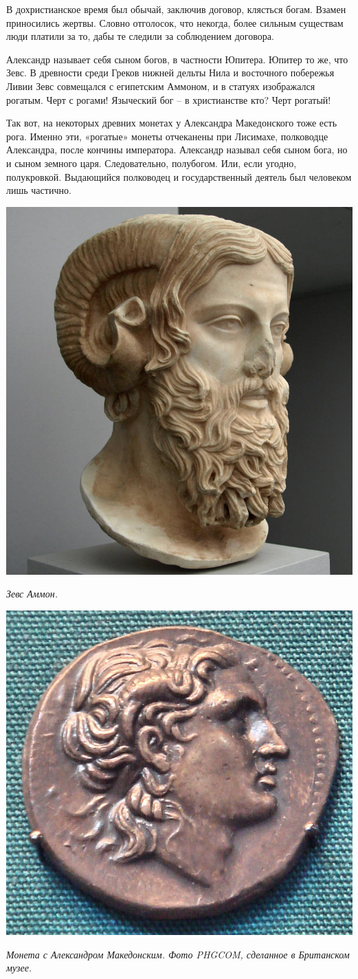 В дохристианское время был обычай, заключив договор, клясться богам. Взамен приносились жертвы. Словно отголосок, что некогда, более сильным существам люди платили за то, дабы те следили за соблюдением договора.

Александр называет себя сыном богов, в частности Юпитера. Юпитер то же, что Зевс. В древности среди Греков нижней дельты Нила и восточного побережья Ливии Зевс совмещался с египетским Аммоном, и в статуях изображался рогатым. Черт с рогами! Языческий бог – в христианстве кто? Черт рогатый!

Так вот, на некоторых древних монетах у Александра Македонского тоже есть рога. Именно эти, «рогатые» монеты отчеканены при Лисимахе, полководце Александра, после кончины императора. Александр называл себя сыном бога, но и сыном земного царя. Следовательно, полубогом. Или, если угодно, полукровкой. Выдающийся полководец и государственный деятель был человеком лишь частично.

\begin{center}
\includegraphics[width=0.40\linewidth]{chast-colebanie-osnov/polane/s-Zeus_Ammon.jpg}

\textit{Зевс Аммон.}
\end{center} 

\begin{center}
\includegraphics[width=0.45\linewidth]{chast-colebanie-osnov/polane/LysimachusCoinWithHornedAlexander.jpg}

\textit{Монета с Александром Македонским. Фото PHGCOM, сделанное в Британском музее.}
\end{center} 

